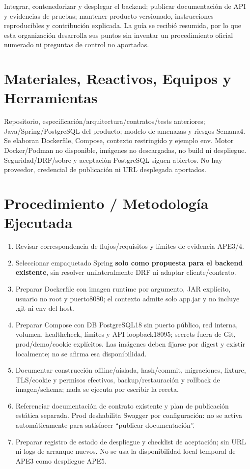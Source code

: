 \documentclass[11pt,a4paper]{article}
\providecommand{\tightlist}{\setlength{\itemsep}{0pt}\setlength{\parskip}{0pt}}
\begin{document}
Integrar, contenedorizar y desplegar el backend; publicar documentación
de API y evidencias de pruebas; mantener producto versionado,
instrucciones reproducibles y contribución explicada. La guía se recibió
resumida, por lo que esta organización desarrolla sus puntos sin
inventar un procedimiento oficial numerado ni preguntas de control no
aportadas.

\section{Materiales, Reactivos, Equipos y
Herramientas}\label{APE5-semana-5-materiales-reactivos-equipos-y-herramientas}

Repositorio, especificación/arquitectura/contratos/tests anteriores;
Java/Spring/PostgreSQL del producto; modelo de amenazas y riesgos
Semana4. Se elaboran Dockerfile, Compose, contexto restringido y ejemplo
env. Motor Docker/Podman no disponible, imágenes no descargadas, no
build ni despliegue. Seguridad/DRF/sobre y aceptación PostgreSQL siguen
abiertos. No hay proveedor, credencial de publicación ni URL desplegada
aportados.

\section{Procedimiento / Metodología
Ejecutada}\label{APE5-semana-5-procedimiento--metodologuxeda-ejecutada}

\begin{enumerate}
\def\labelenumi{\arabic{enumi}.}
\tightlist
\item
  Revisar correspondencia de flujos/requisitos y límites de evidencia
  APE3/4.
\item
  Seleccionar empaquetado Spring \textbf{solo como propuesta para el
  backend existente}, sin resolver unilateralmente DRF ni adaptar
  cliente/contrato.
\item
  Preparar Dockerfile con imagen runtime por argumento, JAR explícito,
  usuario no root y puerto8080; el contexto admite solo app.jar y no
  incluye .git ni env del host.
\item
  Preparar Compose con DB PostgreSQL18 sin puerto público, red interna,
  volumen, healthcheck, límites y API loopback18095; secrets fuera de
  Git, prod/demo/cookie explícitos. Las imágenes deben fijarse por
  digest y existir localmente; no se afirma esa disponibilidad.
\item
  Documentar construcción offline/aislada, hash/commit, migraciones,
  fixture, TLS/cookie y permisos efectivos, backup/restauración y
  rollback de imagen/schema; nada se ejecuta por escribir la receta.
\item
  Referenciar documentación de contrato existente y plan de publicación
  estática separada. Prod deshabilita Swagger por configuración: no se
  activa automáticamente para satisfacer ``publicar documentación''.
\item
  Preparar registro de estado de despliegue y checklist de aceptación;
  sin URL ni logs de arranque nuevos. No se usa la disponibilidad local
  temporal de APE3 como despliegue APE5.
\end{enumerate}
\end{document}
